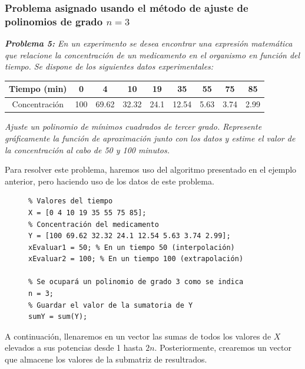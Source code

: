 \documentclass[11pt,letterpaper]{article}
\begin{document}
\subsubsection*{\textcolor{Mahogany}{Problema asignado usando el método de ajuste de polinomios de grado $n=3$}}
\begin{center}
\textit{\textbf{Problema 5:} En un experimento se desea encontrar una expresión matemática que relacione la concentración de un medicamento en el organismo en función del tiempo. Se dispone de los siguientes datos experimentales:}\linebreak\par
	\begin{tabular}{c|cccccccc}
	\hline 
	Tiempo (min) & 0 & 4 & 10 & 19 & 35 & 55 & 75 & 85 \\ 
	\hline 
	Concentración & 100 & 69.62 & 32.32 & 24.1 & 12.54 & 5.63 & 3.74 & 2.99 \\ 
	\hline 
	\end{tabular} \linebreak\par
	\textit{Ajuste un polinomio de mínimos cuadrados de tercer grado. Represente gráficamente la función de aproximación junto con los datos y estime el valor de la concentración al cabo de 50 y 100 minutos.}
\end{center}
Para resolver este problema, haremos uso del algoritmo presentado en el ejemplo anterior, pero haciendo uso de los datos de este problema.
\begin{figure}[H]
\begin{tcolorbox}[title = Problema 5: Valores y sumas iniciales en el algoritmo]
\begin{verbatim}
% Valores del tiempo
X = [0 4 10 19 35 55 75 85]; 
% Concentración del medicamento
Y = [100 69.62 32.32 24.1 12.54 5.63 3.74 2.99];
xEvaluar1 = 50; % En un tiempo 50 (interpolación)
xEvaluar2 = 100; % En un tiempo 100 (extrapolación)

% Se ocupará un polinomio de grado 3 como se indica
n = 3;
% Guardar el valor de la sumatoria de Y
sumY = sum(Y);
\end{verbatim}
\end{tcolorbox}
\end{figure}
A continuación, llenaremos en un vector las sumas de todos los valores de $X$ elevados a sus potencias desde 1 hasta $2n$. Posteriormente, crearemos un vector que almacene los valores de la submatriz de resultrados.
\end{document}
